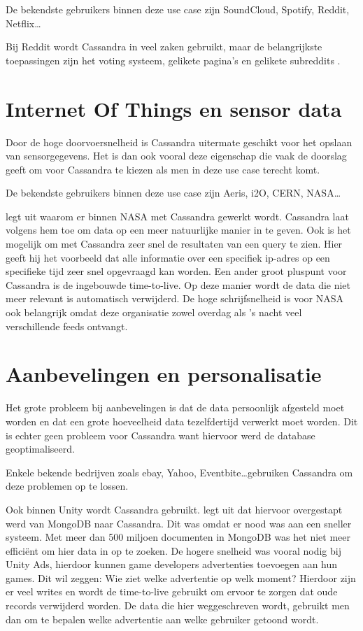 De bekendste gebruikers binnen deze use case zijn SoundCloud, Spotify, Reddit, Netflix\dots

Bij Reddit wordt Cassandra in veel zaken gebruikt, maar de belangrijkste toepassingen zijn het voting systeem, gelikete pagina's en gelikete subreddits \citep{Harvey2013Reddit}.

\section{Internet Of Things en sensor data}
Door de hoge doorvoersnelheid is Cassandra uitermate geschikt voor het opslaan van sensorgegevens.
Het is dan ook vooral deze eigenschap die vaak de doorslag geeft om voor Cassandra te kiezen als men in deze use case terecht komt.

De bekendste gebruikers binnen deze use case zijn Aeris, i2O, CERN, NASA\dots

\cite{Keller2013Nasa} legt uit waarom er binnen NASA met Cassandra gewerkt wordt.
Cassandra laat volgens hem toe om data op een meer natuurlijke manier in te geven.
Ook is het mogelijk om met Cassandra zeer snel de resultaten van een query te zien.
Hier geeft hij het voorbeeld dat alle informatie over een specifiek ip-adres op een specifieke tijd zeer snel opgevraagd kan worden.
Een ander groot pluspunt voor Cassandra is de ingebouwde time-to-live.
Op deze manier wordt de data die niet meer relevant is automatisch verwijderd.
De hoge schrijfsnelheid is voor NASA ook belangrijk omdat deze organisatie zowel overdag als 's nacht veel verschillende feeds ontvangt.

\section{Aanbevelingen en personalisatie}
Het grote probleem bij aanbevelingen is dat de data persoonlijk afgesteld moet worden en dat een grote hoeveelheid data tezelfdertijd verwerkt moet worden.
Dit is echter geen probleem voor Cassandra want hiervoor werd de database geoptimaliseerd.

Enkele bekende bedrijven zoals ebay, Yahoo, Eventbite\dots  gebruiken Cassandra om deze problemen op te lossen.

Ook binnen Unity wordt Cassandra gebruikt.
\cite{Makinen2015Cassandra} legt uit dat hiervoor overgestapt werd van MongoDB naar Cassandra.
Dit was omdat er nood was aan een sneller systeem.
Met meer dan 500 miljoen documenten in MongoDB was het niet meer efficiënt om hier data in op te zoeken.
De hogere snelheid was vooral nodig bij Unity Ads, hierdoor kunnen game developers advertenties toevoegen aan hun games.
Dit wil zeggen: Wie ziet welke advertentie op welk moment?
Hierdoor zijn er veel writes en wordt de time-to-live gebruikt om ervoor te zorgen dat oude records verwijderd worden.
De data die hier weggeschreven wordt, gebruikt men dan om te bepalen welke advertentie aan welke gebruiker getoond wordt.

